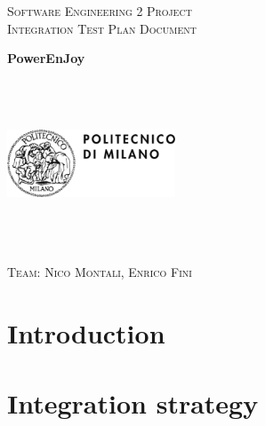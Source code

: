 \documentclass[a4paper,12pt,oneside]{book}
\begin{document}
	
	\pagestyle{empty}\centering
	\textsc{\Large Software Engineering 2 Project\\}
	\textsc{Integration Test Plan Document}

	\vfill

	\textbf{\Huge PowerEnJoy}
	
	\vfill
	\begin{center}	
	\includegraphics[width=5cm,height=5cm,keepaspectratio]{polimi}
	\end{center}
	\textsc{\Large Team: Nico Montali, Enrico Fini}
	
	\tableofcontents

	\begin{flushleft}
	\chapter{Introduction}\label{cap:Intro}
	
	\chapter{Integration strategy}\label{cap:Strategy}
	
	\end{flushleft}
\end{document}
